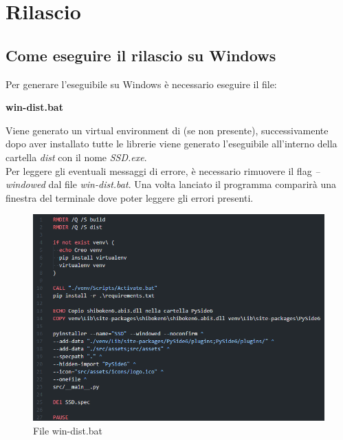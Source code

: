 \section{Rilascio}

\subsection{Come eseguire il rilascio su Windows}
Per generare l'eseguibile su Windows è necessario eseguire il file:
\newline{}\centerline{\textbf{win-dist.bat}}\newline{}
Viene generato un virtual environment di  (se non presente), successivamente dopo aver installato tutte le librerie viene generato l'eseguibile all'interno della cartella \textit{dist} con il nome \textit{SSD.exe}.\\
Per leggere gli eventuali messaggi di errore, è necessario rimuovere il flag \textit{--windowed} dal file \textit{win-dist.bat}. Una volta lanciato il programma comparirà una finestra del terminale dove poter leggere gli errori presenti.
\begin{figure}[H]
    \centering
    \includegraphics[scale = 0.6]{components/img/pyinstaller.png}
    \caption{File win-dist.bat}
    \label{fig:File win-dist.bat}
\end{figure}

